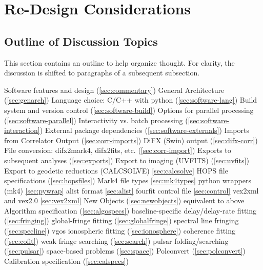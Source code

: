 %
%

\section{Re-Design Considerations}
\label{sec:consider}

\subsection{Outline of Discussion Topics}
\label{sec:outline}

This section contains an outline to help organize thought.
For clarity, the discussion is shifted to paragraphs of a subsequent
subsection.

\begin{outline}[enumerate]
\1 Software features and design (\ref{sec:commentary})
  \2 General Architecture (\ref{sec:genarch})
    \3 Language choice: C/C++ with python (\ref{sec:software-lang})
    \3 Build system and version control (\ref{sec:software-build})
    \3 Options for parallel processing (\ref{sec:software-parallel})
    \3 Interactivity vs. batch processing (\ref{sec:software-interaction})
    \3 External package dependencies (\ref{sec:software-externals})
  \2 Imports from Correlator Output (\ref{sec:corr-imports})
    \3 DiFX (Swin) output (\ref{sec:difx-corr})
    \3 File conversion: difx2mark4, difx2fits, etc. (\ref{sec:corr-import})
  \2 Exports to subsequent analyses (\ref{sec:exports})
    \3 Export to imaging (UVFITS) (\ref{sec:uvfits})
    \3 Export to geodetic reductions (CALCSOLVE) \ref{sec:calcsolve}
  \2 HOPS file specifications (\ref{sec:hopsfiles})
    \3 Mark4 file types \ref{sec:mk4types}
    \3 python wrappers (mk4) \ref{sec:pywrap}
    \3 alist format \ref{sec:alist}
    \3 fourfit control file \ref{sec:control}
    \3 vex2xml and vex2.0 \ref{sec:vex2xml}
  \2 New Objects (\ref{sec:newobjects})
    \3 equivalent to above
  \2 Algorithm specification (\ref{sec:algospecs})
    \3 baseline-specific delay/delay-rate fitting (\ref{sec:fringing})
    \3 global-fringe fitting (\ref{sec:globalfringe})
    \3 spectral line fringing (\ref{sec:specline})
    \3 vgos ionospheric fitting (\ref{sec:ionosphere})
    \3 coherence fitting (\ref{sec:cofit})
    \3 weak fringe searching (\ref{sec:search})
    \3 pulsar folding/searching (\ref{sec:pulsar})
    \3 space-based problems (\ref{sec:space})
    \3 Polconvert (\ref{sec:polconvert})
  \2 Calibration specification (\ref{sec:calspecs})

\end{outline}
